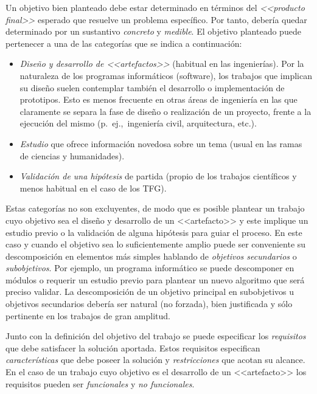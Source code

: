Un objetivo bien planteado debe estar determinado en términos del \emph{<<producto final>>} esperado que resuelve un problema específico. Por tanto, debería quedar determinado por un sustantivo \emph{concreto} y \emph{medible}. El objetivo planteado puede pertenecer a una de las categorías que se indica a continuación:
\begin{itemize}
	\item \emph{Diseño y desarrollo de <<artefactos>>}
	(habitual en las ingenierías). Por la naturaleza de los programas informáticos (software), los trabajos que implican su diseño suelen contemplar también el desarrollo o implementación de prototipos. Esto es menos frecuente en otras áreas de ingeniería en las que claramente se separa la fase de diseño o realización de un proyecto, frente a la ejecución del mismo (p.~ej.,~ingeniería civil, arquitectura, etc.). 
    
	\item \emph{Estudio} que ofrece información novedosa sobre un tema (usual en las ramas de ciencias y humanidades). 
    
	\item \emph{Validación de una 
	hipótesis} de partida (propio de los trabajos 
	científicos y menos habitual en el caso de los TFG).
\end{itemize}

Estas categorías no son excluyentes, de modo que es posible plantear un trabajo cuyo objetivo sea el diseño y desarrollo de un <<artefacto>> y este implique un estudio previo o la validación de alguna hipótesis para guiar el proceso. En este caso y cuando el objetivo sea lo suficientemente amplio puede ser conveniente su descomposición en elementos más simples hablando de \emph{objetivos secundarios} o \emph{subobjetivos}. Por ejemplo, un programa informático se puede descomponer en módulos o requerir un estudio previo para plantear un nuevo algoritmo que será preciso validar. La descomposición de un objetivo principal en subobjetivos u objetivos secundarios debería ser natural (no forzada), bien justificada y sólo pertinente en los trabajos de gran amplitud.

Junto con la definición del objetivo del trabajo se puede especificar los \emph{requisitos} que debe satisfacer la solución aportada. Estos requisitos especifican \emph{características} que debe poseer la solución y \emph{restricciones} que acotan su alcance. En el caso de un trabajo cuyo objetivo es el desarrollo de un <<artefacto>> los requisitos pueden ser \emph{funcionales} y \emph{no funcionales}.

